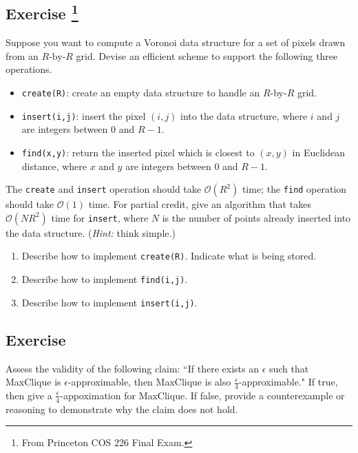 \documentclass[14pt]{extreport}
\newcounter{counter}
\newcommand{\Exercise}{Exercise \stepcounter{counter}\thecounter}
\begin{document}
\subsection*{\Exercise\footnote{From Princeton COS 226 Final Exam.}}
Suppose you want to compute a Voronoi data structure for a set of pixels drawn from an \( R \)-by-\( R \) grid. Devise an efficient scheme to support the following three operations.

\begin{itemize}
  \item \texttt{create(R)}: create an empty data structure to handle an \( R \)-by-\( R \) grid.
  \item \texttt{insert(i,j)}: insert the pixel \( (i,j) \) into the data structure, where \( i \) and \( j \) are integers between \( 0 \) and \( R-1 \).
  \item \texttt{find(x,y)}: return the inserted pixel which is closest to \( (x,y) \) in Euclidean distance, where \( x \) and \( y \) are integers between \( 0 \) and \( R-1 \).
\end{itemize}

The \texttt{create} and \texttt{insert} operation should take \( \mathcal{O}(R^2) \) time; the \texttt{find} operation should take \( \mathcal{O}(1) \) time. For partial credit, give an algorithm that takes \( \mathcal{O}(NR^2) \) time for \texttt{insert}, where \( N \) is the number of points already inserted into the data structure. (\textit{Hint:} think simple.)

\begin{enumerate}[label=(\alph*)]
  \item Describe how to implement \texttt{create(R)}. Indicate what is being stored.
  \item Describe how to implement \texttt{find(i,j)}.
  \item Describe how to implement \texttt{insert(i,j)}.
\end{enumerate}

\subsection*{\Exercise}
    Assess the validity of the following claim: ``If there exists an $\epsilon$ such that \textsf{MaxClique} is $\epsilon$-approximable, then \textsf{MaxClique} is also $\frac{\epsilon}{4}$-approximable." If true, then give a $\frac{\epsilon}{4}$-appoximation for \textsf{MaxClique}. If false, provide a counterexample or reasoning to demonstrate why the claim does not hold.
\end{document}
